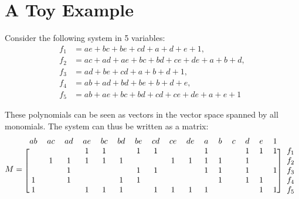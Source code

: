 \documentclass[a4paper,UKenglish,cleveref, autoref]{lipics-v2019}
\begin{document}
\section{A Toy Example}

Consider the following system in 5 variables:
\begin{align*}
  f_1 &= ae + bc + be + cd + a + d + e + 1,\\
  f_2 &= ac + ad + ae + bc + bd + ce + de + a + b + d,\\
  f_3 &= ad + be + cd  + a + b + d + 1,\\
  f_4 &= ab + ad + bd + be + b + d + e,\\            
  f_5 &= ab + ae + bc + bd + cd + ce + de + a + e + 1
\end{align*}



These polynomials can be seen as vectors in the vector space spanned by all
monomials. The system can thus be written as a matrix:
\[
  M = \begin{blockarray}{ccccccccccccccccc}
  ab & ac & ad & ae & bc & bd & be & cd & ce & de & a & b & c & d & e & 1 & \\
  \begin{block}{[cccccccccccccccc]c}
     &    &    & 1  & 1  &    & 1  & 1  &    &    & 1 &   &   & 1 & 1 & 1 & f_1\\
     & 1  & 1  & 1  & 1  & 1  &    &    & 1  & 1  & 1 & 1 &   & 1 &   &   & f_2 \\
     &    & 1  &    &    &    & 1  & 1  &    &    & 1 & 1 &   & 1 &   & 1 & f_3 \\
   1 &    & 1  &    &    & 1  & 1  &    &    &    &   & 1 &   & 1 & 1 &   & f_4 \\
   1 &    &    & 1  & 1  & 1  &    & 1  & 1  & 1  & 1 &   &   &   & 1 & 1 & f_5 \\
    \end{block}
\end{blockarray}
\]
\end{document}
